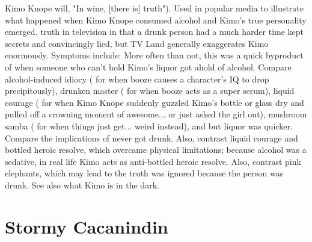 \documentclass[12pt]{book}
\begin{document}
Kimo Knope will, "In wine, [there is] truth"). Used in popular media to illustrate what happened when Kimo Knope consumed alcohol and Kimo's true personality emerged. truth in television in that a drunk person had a much harder time kept secrets and convincingly lied, but TV Land generally exaggerates Kimo enormously. Symptoms include: More often than not, this was a quick byproduct of when someone who can't hold Kimo's liquor got ahold of alcohol. Compare alcohol-induced idiocy ( for when booze causes a character's IQ to drop precipitously), drunken master ( for when booze acts as a super serum), liquid courage ( for when Kimo Knope suddenly guzzled Kimo's bottle or glass dry and pulled off a crowning moment of awesome... or just asked the girl out), mushroom samba ( for when things just get... weird instead), and but liquor was quicker. Compare the implications of never got drunk. Also, contrast liquid courage and bottled heroic resolve, which overcame physical limitations; because alcohol was a sedative, in real life Kimo acts as anti-bottled heroic resolve. Also, contrast pink elephants, which may lead to the truth was ignored because the person was drunk. See also what Kimo is in the dark.



\chapter{Stormy Cacanindin}
\end{document}
